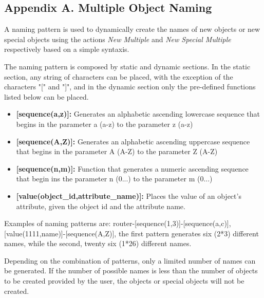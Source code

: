 \documentclass[a4paper]{article}
\begin{document}
		\clearpage
		\begin{appendices}
			\appendix
			\section{Appendix A. Multiple Object Naming} \label{app:AppendixA}
			A naming pattern is used to dynamically create the names of new objects or new special objects using the actions \textit{New Multiple} and \textit{New Special Multiple} respectively based on a simple syntaxis.			
			
			The naming pattern is composed by static and dynamic sections. In the static section, any string of characters can be placed, with the exception of the characters "[" and "]", and in the dynamic section only the pre-defined functions listed below can be placed.
			
			\begin{itemize}
				\item \textbf{[sequence(a,z)]:} Generates an alphabetic ascending lowercase  sequence that begins in the parameter a (a-z) to the parameter z (a-z)
				\item \textbf{[sequence(A,Z)]:} Generates an alphabetic ascending uppercase sequence that begins in the parameter A (A-Z) to the parameter Z (A-Z)
				\item \textbf{[sequence(n,m)]:} Function that generates a numeric ascending sequence that begin ins the parameter n (0...) to the parameter m (0...)
				\item \textbf{[value(object\_id,attribute\_name)]:} Places the value of an object's attribute, given the object id and the attribute name.
			\end{itemize}
			
			Examples of naming patterns are: router-[sequence(1,3)]-[sequence(a,c)], [value(1111,name)]-[sequence(A,Z)], the first pattern generates six (2*3) different names, while the second, twenty six (1*26) different names.
			
			Depending on the combination of patterns, only a limited number of names can be generated. If the number of possible names is less than the number of objects to be created provided by the user, the objects or special objects will not be created.
			\newpage
			\appendix

\end{appendices}
\end{document}
